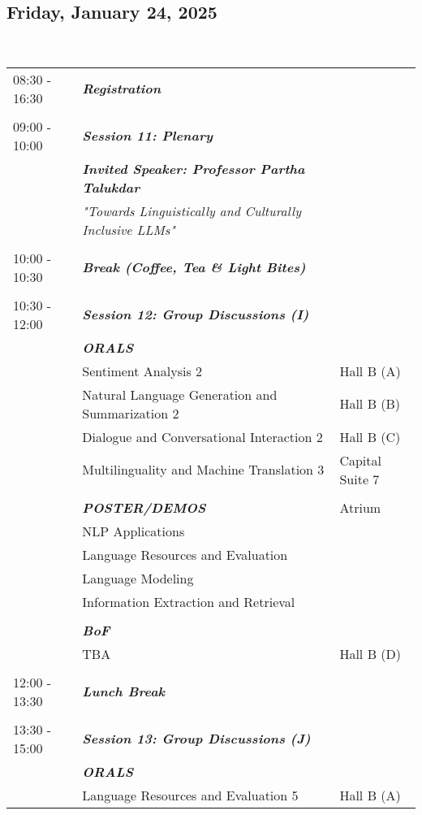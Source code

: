 \subsection{Friday, January 24, 2025}
\\
\begin{longtable}{p{15mm}p{60mm}p{30mm}}
{08:30 - 16:30} & \emph{\textbf{Registration}} & \\\\
{09:00 - 10:00} & \emph{\textbf{Session 11: Plenary}} & \\
& \emph{\textbf{Invited Speaker: Professor Partha Talukdar}} & \\
& \emph{"Towards Linguistically and Culturally Inclusive LLMs"} & \\\\
{10:00 - 10:30} & \emph{\textbf{Break (Coffee, Tea \& Light Bites)}} & \\\\
{10:30 - 12:00} & \emph{\textbf{Session 12: Group Discussions (I)}} & \\
& \emph{\textbf{ORALS}} & \\
& Sentiment Analysis 2 & Hall B (A) \\
& Natural Language Generation and Summarization 2 & Hall B (B) \\
& Dialogue and Conversational Interaction 2 & Hall B (C) \\
& Multilinguality and Machine Translation 3 & Capital Suite 7 \\\\
& \emph{\textbf{POSTER/DEMOS}} & Atrium \\
& NLP Applications & \\
& Language Resources and Evaluation & \\
& Language Modeling & \\
& Information Extraction and Retrieval & \\\\
& \emph{\textbf{BoF}} & \\
& TBA & Hall B (D) \\\\
{12:00 - 13:30} & \emph{\textbf{Lunch Break}} & \\\\
{13:30 - 15:00} & \emph{\textbf{Session 13: Group Discussions (J)}} & \\
& \emph{\textbf{ORALS}} & \\
& Language Resources and Evaluation 5 & Hall B (A) \\

\end{longtable}
